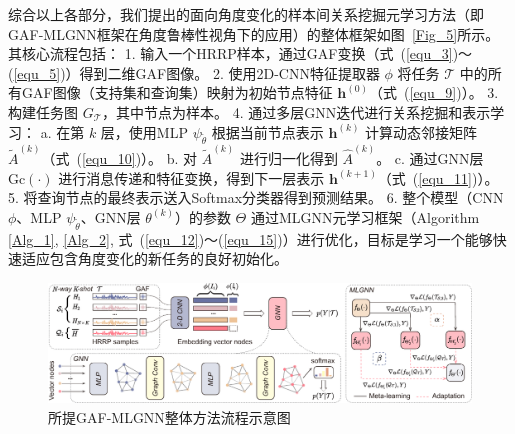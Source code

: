 综合以上各部分，我们提出的面向角度变化的样本间关系挖掘元学习方法（即GAF-MLGNN框架在角度鲁棒性视角下的应用）的整体框架如图~\ref{Fig_5}所示。其核心流程包括：
1.  输入一个HRRP样本，通过GAF变换（式~(\ref{equ_3})〜(\ref{equ_5})）得到二维GAF图像。
2.  使用2D-CNN特征提取器 $\phi$ 将任务 $\mathcal{T}$ 中的所有GAF图像（支持集和查询集）映射为初始节点特征 $\mathbf{h}^{(0)}$（式~(\ref{equ_9})）。
3.  构建任务图 $G_{\mathcal{T}}$，其中节点为样本。
4.  通过多层GNN迭代进行关系挖掘和表示学习：
    a.  在第 $k$ 层，使用MLP $\psi_{\tilde{\theta}}$ 根据当前节点表示 $\mathbf{h}^{(k)}$ 计算动态邻接矩阵 $\tilde{A}^{(k)}$（式~(\ref{equ_10})）。
    b.  对 $\tilde{A}^{(k)}$ 进行归一化得到 $\hat{A}^{(k)}$。
    c.  通过GNN层 $\mathrm{Gc}(\cdot)$ 进行消息传递和特征变换，得到下一层表示 $\mathbf{h}^{(k+1)}$（式~(\ref{equ_11})）。
5.  将查询节点的最终表示送入Softmax分类器得到预测结果。
6.  整个模型（CNN $\phi$、MLP $\psi_{\tilde{\theta}}$、GNN层 $\theta^{(k)}$）的参数 $\Theta$ 通过MLGNN元学习框架（Algorithm \ref{Alg_1}, \ref{Alg_2}, 式~(\ref{equ_12})〜(\ref{equ_15})）进行优化，目标是学习一个能够快速适应包含角度变化的新任务的良好初始化。

\begin{figure}[h]
    \centering
    \includegraphics[width=\linewidth]{figures/method2.pdf} %
    \caption{所提GAF-MLGNN整体方法流程示意图}
    \label{fig:dataset_chap3}
\end{figure}

